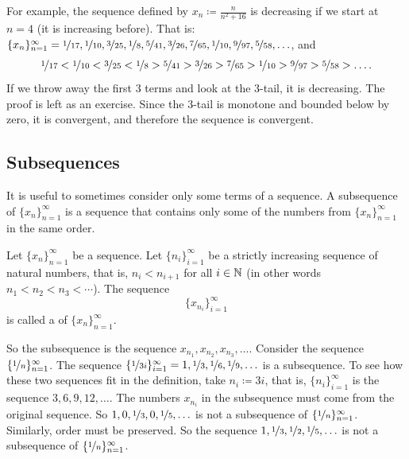 For example, the sequence defined by $x_n \coloneqq \frac{n}{n^2+16}$ is decreasing
if we start at $n=4$ (it is increasing before).  That is:
$\{ x_n \}_{n=1}^\infty =
\nicefrac{1}{17},
\nicefrac{1}{10},
\nicefrac{3}{25},
\nicefrac{1}{8},
\nicefrac{5}{41},
\nicefrac{3}{26},
\nicefrac{7}{65},
\nicefrac{1}{10},
\nicefrac{9}{97},
\nicefrac{5}{58},\ldots$, and 
\begin{equation*}
\nicefrac{1}{17} <
\nicefrac{1}{10} <
\nicefrac{3}{25} <
\nicefrac{1}{8} >
\nicefrac{5}{41} >
\nicefrac{3}{26} >
\nicefrac{7}{65} >
\nicefrac{1}{10} >
\nicefrac{9}{97} >
\nicefrac{5}{58} > \ldots .
\end{equation*}
If we throw away the first 3 terms
and look at the 3-tail, it is decreasing.  The proof is left as an exercise.  Since the 3-tail
is monotone and bounded below by zero, it is convergent, and therefore the sequence is convergent.

\subsection{Subsequences}

It is useful to sometimes consider only some terms of a sequence.
A subsequence of $\{ x_n \}_{n=1}^\infty$ is a sequence that contains
only some of the numbers from $\{ x_n \}_{n=1}^\infty$ in the same order.

\begin{defn}
Let $\{ x_n \}_{n=1}^\infty$ be a sequence.
Let $\{ n_i \}_{i=1}^\infty$ be a strictly increasing sequence of natural
numbers, that is, $n_i < n_{i+1}$ for all $i \in {\mathbb{N}}$ (in other words $n_1 < n_2 < n_3 < \cdots$).  
The sequence
\begin{equation*}
\{ x_{n_i} \}_{i=1}^\infty
\end{equation*}
is called 
a \emph{} of $\{ x_n \}_{n=1}^\infty$.
\end{defn}

So the subsequence is the sequence $x_{n_1},x_{n_2},x_{n_3},\ldots$.
Consider the sequence $\{ \nicefrac{1}{n} \}_{n=1}^\infty$.  The sequence
$\{ \nicefrac{1}{3i} \}_{i=1}^\infty
= 1,\nicefrac{1}{3},\nicefrac{1}{6},\nicefrac{1}{9},\ldots$
is a subsequence.  To see how these two
sequences fit in the definition, take $n_i \coloneqq 3i$,
that is, $\{ n_i \}_{i=1}^\infty$ is the
sequence $3,6,9,12,\ldots$.  
The numbers $x_{n_i}$ in the
subsequence must come from the original sequence.  So $1,0,\nicefrac{1}{3},0,
\nicefrac{1}{5},\ldots$
is not a subsequence of $\{ \nicefrac{1}{n} \}_{n=1}^\infty$.  Similarly, order
must be preserved.  So
the sequence $1,\nicefrac{1}{3},\nicefrac{1}{2},\nicefrac{1}{5},\ldots$
is not a subsequence of $\{ \nicefrac{1}{n} \}_{n=1}^\infty$.

